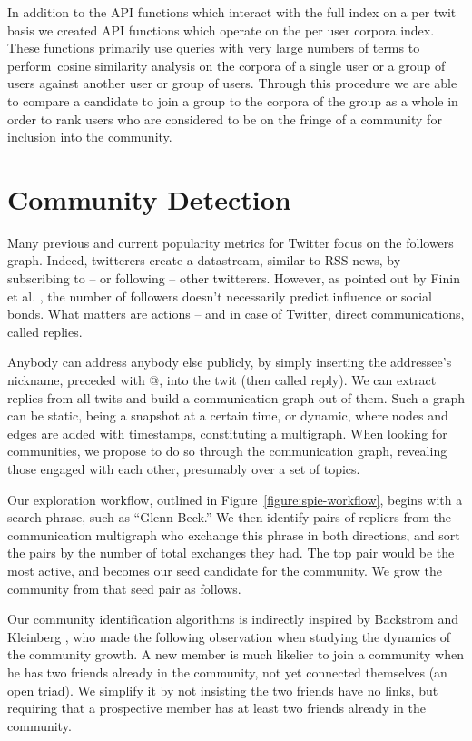 \documentclass[10pt,oneside]{memoir}
\begin{document}
\begin{Spacing}{2}
\begin{enumerate}
\end{enumerate}

In addition to the API functions which interact with the full index
on a per twit basis we created API functions which operate on the
per user corpora index. These functions primarily use queries with
very large numbers of terms to perform~cosine similarity analysis
on the corpora of a single user or a group of users against another
user or group of users. Through this procedure we are able to
compare a candidate to join a group to the corpora of the group as
a whole in order to rank users who are considered to be on the
fringe of a community for inclusion into the community.


\pagebreak \section{Community Detection}
\label{communitydetection}

Many previous and current popularity metrics for Twitter focus on
the followers graph. Indeed, twitterers create a datastream,
similar to RSS news, by subscribing to -- or following -- other
twitterers. However, as pointed out by Finin et al.
\cite{DBLP:conf/kdd/JavaSFT07}, the number of followers doesn't
necessarily predict influence or social bonds. What matters are
actions -- and in case of Twitter, direct communications, called
replies.


Anybody can address anybody else publicly, by simply inserting the
addressee's nickname, preceded with @, into the twit (then called
reply). We can extract replies from all twits and build a
communication graph out of them. Such a graph can be static, being
a snapshot at a certain time, or dynamic, where nodes and edges are
added with timestamps, constituting a multigraph. When looking for
communities, we propose to do so through the communication graph,
revealing those engaged with each other, presumably over a set of
topics.


Our exploration workflow, outlined in Figure~\ref{figure:spie-workflow},
begins with a search phrase, such as ``Glenn Beck.'' We then identify
pairs of repliers from the communication multigraph who exchange
this phrase in both directions, and sort the pairs by the number of
total exchanges they had. The top pair would be the most active,
and becomes our seed candidate for the community. We grow the
community from that seed pair as follows.


Our community identification algorithms is indirectly inspired by
Backstrom and Kleinberg \cite{DBLP:conf/kdd/BackstromHKL06}, who made
the following observation when studying the dynamics of the
community growth. A new member is much likelier to join a community
when he has two friends already in the community, not yet connected
themselves (an open triad). We simplify it by not insisting the two
friends have no links, but requiring that a prospective member has
at least two friends already in the community.



\end{Spacing}
\end{document}
